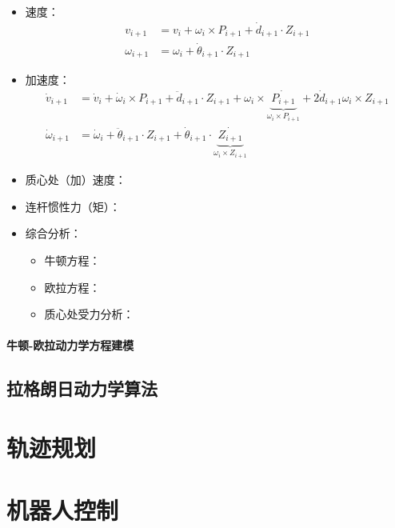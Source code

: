 \documentclass[
12pt, %
a4paper, 
oneside, %
headinclude,footinclude, %
]{scrartcl}
\begin{document}
\begin{itemize}
\item 速度：
\begin{align*}
v_{i + 1} &= v_i + \omega_i \times P_{i + 1} + \dot{d}_{i + 1} \cdot Z_{i + 1} \\
\omega_{i + 1} &= \omega_i + \dot{\theta}_{i + 1} \cdot Z_{i + 1}
\end{align*}
\item 加速度：
\begin{align*}
\dot{v}_{i + 1} &= \dot{v}_i + \dot{\omega}_i \times P_{i + 1} + \ddot{d}_{i + 1} \cdot Z_{i + 1} + \omega_i \times \underbrace{\dot{P_{i + 1}}}_{\omega_i \times P_{i + 1}} + 2\dot{d}_{i + 1} \omega_i \times Z_{i + 1} \\
\dot{\omega}_{i + 1} &= \dot{\omega}_i + \ddot{\theta}_{i + 1} \cdot Z_{i + 1} + \dot{\theta}_{i + 1} \cdot \underbrace{\dot{Z_{i + 1}}}_{\omega_i \times Z_{i + 1}}
\end{align*}
\item 质心处（加）速度：
\item 连杆惯性力（矩）：
\item 综合分析：
\begin{itemize}
\item 牛顿方程：
\item 欧拉方程：
\item 质心处受力分析：
\end{itemize}
\end{itemize}
\paragraph{牛顿-欧拉动力学方程建模}
\subsection{拉格朗日动力学算法}
\section{轨迹规划}
\section{机器人控制}
\end{document}
